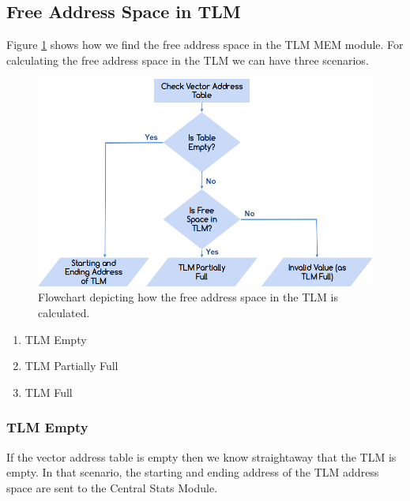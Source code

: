 \documentclass{listhesis}
\begin{document}
\subsection{Free Address Space in TLM}
Figure \ref{fig:freeSpaceTLM} shows how we find the free address space in the TLM MEM module. For calculating the free address space in the TLM we can have three scenarios. 
\begin{figure}
  \includegraphics[width=\linewidth]{freespace.png}
  \centering
  \caption{Flowchart depicting how the free address space in the TLM is calculated.}
  \label{fig:freeSpaceTLM}
\end{figure}
\begin{enumerate}
  \item TLM Empty 
  \item TLM Partially Full
  \item TLM Full
\end{enumerate}
\subsubsection{TLM Empty}
If the vector address table is empty then we know straightaway that the TLM is empty. In that scenario, the starting and ending address of the TLM address space are sent to the Central Stats Module.\\ 
\end{document}
